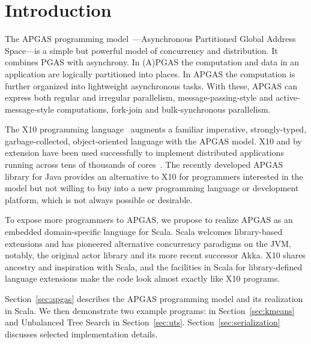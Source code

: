 \section*{Introduction}

The APGAS programming model~\cite{amp10}---Asynchronous Partitioned Global Address Space---is a simple but powerful
model of concurrency and distribution. It combines PGAS with asynchrony.
In (A)PGAS the computation and data in an application are logically partitioned into places.
In APGAS the computation is further organized into lightweight asynchronous tasks.
With these, APGAS can express both
regular and irregular parallelism, message-passing-style and
active-message-style computations, fork-join and bulk-synchronous
parallelism. %

The X10 programming language~\cite{oopsla05} augments a familiar imperative, strongly-typed, garbage-collected, object-oriented language with the APGAS model.
X10 and by extension
\apgas have been used successfully to implement distributed applications
running across tens of thousands of cores~\cite{TardieuETAL14X10ApgasAtPetascale}.
The recently developed APGAS library for Java \cite{APGASJava} provides an alternative to X10 for programmers interested in the \apgas model but not willing to buy into a new programming language or development platform, which is not always possible or desirable.

To expose more programmers to APGAS, we propose to realize APGAS as an embedded domain-specific language for Scala. 
Scala welcomes library-based extensions and has pioneered alternative concurrency paradigms on the JVM,
notably, the original actor library \cite{HallerOdersky07ActorsThatUnifyThreadsEvents} and its more recent successor Akka.
X10 shares ancestry and inspiration with Scala, and the
facilities in Scala for library-defined language extensions make the code look
almost exactly like X10 programs.

Section~\ref{sec:apgas} describes the APGAS programming model and its realization in Scala. We then demonstrate two example programs: \kmeans in Section~\ref{sec:kmeans} and Unbalanced Tree Search in Section~\ref{sec:uts}. Section~\ref{sec:serialization} discusses selected implementation details.%



